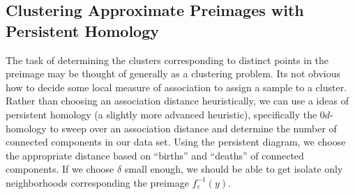 \documentclass[12pt]{article}
\begin{document}
\subsection{Clustering Approximate Preimages with Persistent Homology}
The task of determining the clusters corresponding to distinct points in the preimage may be thought of generally as a clustering problem. Its not obvious how to decide some local measure of association to assign a sample to a cluster. Rather than choosing an association distance heuristically, we can use a ideas of persistent homology (a slightly more advanced heuristic), specifically the $0d$-homology to sweep over an association distance and determine the number of connected components in our data set. Using the persistent diagram, we choose the appropriate distance based on ``births'' and ``deaths'' of connected components. If we choose $\delta$ small enough, we should be able to get isolate only neighborhoods corresponding the preimage $f_{\varepsilon}^{-1}(y)$.
\end{document}
